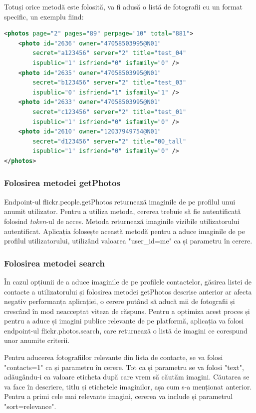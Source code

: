 Totuși orice metodă este folosită, va fi adusă o listă de fotografii cu un format specific, un exemplu fiind:
\begin{lstlisting}[language=XML]
<photos page="2" pages="89" perpage="10" total="881">
	<photo id="2636" owner="47058503995@N01" 
		secret="a123456" server="2" title="test_04"
		ispublic="1" isfriend="0" isfamily="0" />
	<photo id="2635" owner="47058503995@N01"
		secret="b123456" server="2" title="test_03"
		ispublic="0" isfriend="1" isfamily="1" />
	<photo id="2633" owner="47058503995@N01"
		secret="c123456" server="2" title="test_01"
		ispublic="1" isfriend="0" isfamily="0" />
	<photo id="2610" owner="12037949754@N01"
		secret="d123456" server="2" title="00_tall"
		ispublic="1" isfriend="0" isfamily="0" />
</photos>
\end{lstlisting}
\cite{flickr-api}

\subsubsection{Folosirea metodei getPhotos}
Endpoint-ul flickr.people.getPhotos returnează imaginile de pe profilul unui anumit utilizator. Pentru a utiliza metoda, cererea trebuie să fie autentificată folosind \textit{token}-ul de acces. Metoda returnează imaginile vizibile utilizatorului autentificat. Aplicația folosește această metodă pentru a aduce imaginile de pe profilul utilizatorului, utilizând valoarea "user\_id=me" ca și parametru în cerere. 

\subsubsection{Folosirea metodei search}
În cazul opțiunii de a aduce imaginile de pe profilele contactelor, găsirea listei de contacte a utilizatorului și folosirea metodei getPhotos descrise anterior ar afecta negativ performanța aplicației, o cerere putând să aducă mii de fotografii și crescând în mod neacceptat viteza de răspuns.
Pentru a optimiza acest proces și pentru a aduce și imagini publice relevante de pe platformă, aplicația va folosi endpoint-ul flickr.photos.search, care returnează o listă de imagini ce corespund unor anumite criterii.

Pentru aducerea fotografiilor relevante din lista de contacte, se va folosi "contacts=1" ca și parametru în cerere. Tot ca și parametru se va folosi "text", adăugându-i ca valoare eticheta după care vrem să căutăm imagini. Căutarea se va face în descriere, titlu și etichetele imaginilor, așa cum s-a menționat anterior. Pentru a primi cele mai relevante imagini, cererea va include și parametrul "sort=relevance".

